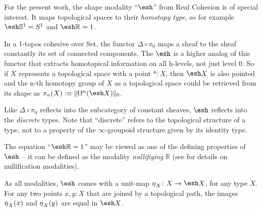 \documentclass[9pt,twosided]{amsart}
\newcommand{\shape}{\ensuremath{\mathord{\raisebox{0.5pt}{\text{\rm\esh}}}}}
\newcommand{\bR}{\mathbb R}
\newcommand{\bS}{\mathbb S}
\begin{document}
For the present work, the shape modality ``$\shape$'' from Real Cohesion is of special interest.
It maps topological spaces to their \emph{homotopy type}, so for example $\shape \bS^{1} =\sphere{1}$ 
and $\shape \bR =1$.

In a 1-topos cohesive over Set, the functor $\Delta\circ\pi_0$ maps a sheaf to the sheaf constantly its set of connected components.
The $\shape$ is a higher analog of this functor that extracts homotopical information on all h-levels, not just level 0.
So if $X$ represents a topological space with a point $\ast: X$, 
then $\shape X$ is also pointed and the n-th homotopy group of $X$ as a topological space 
could be retrieved from its shape 
as $\pi_n(X):\equiv\trunc{0}{\Omega^n(\shape X)}$.

Like $\Delta\circ\pi_0$ reflects into the subcategory of constant sheaves, $\shape$ reflects into the \emph{discrete} types.
Note that ``discrete'' refers to the topological structure of a type, 
not to a property of the $\infty$-groupoid structure given by its identity type.

The equation ``$\shape \bR=1$'' may be viewed as one of the defining properties of $\shape$
-- it can be defined as the modality \emph{nullifiying} $\bR$ (see \cite[Section 2.3]{RijkeSpittersShulman} for details on nullification modalities).

As all modalities, $\shape$ comes with a unit-map $\modalunit_X\colon X \to \shape X$, for any type $X$.
For any two points $x,y: X$ that are joined by a topological path, 
the images ${\eta_{}}_X(x)$ and ${\eta_{}}_X(y)$ are equal in $\shape X$.
\end{document}
